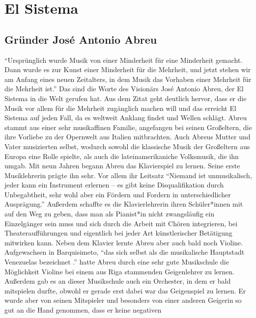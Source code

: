 \section{El Sistema}

\subsection{Gründer José Antonio Abreu}

\enquote{Ursprünglich wurde Musik von einer Minderheit für eine Minderheit
gemacht. Dann wurde es zur Kunst einer Minderheit für die Mehrheit, und jetzt
stehen wir am Anfang eines neuen Zeitalters, in dem Musik das Vorhaben einer
Mehrheit für die Mehrheit ist.} \autocite[5]{kaufmann:el_sistema} Das sind die
Worte des Visionärs José Antonio Abreu, der El Sistema in die Welt gerufen hat. Aus dem Zitat geht
deutlich hervor, dass er die Musik vor allem für die Mehrheit zugänglich machen
will und das erreicht El Sistema auf jeden Fall, da es weltweit Anklang findet
und Wellen schlägt. Abreu stammt aus einer sehr musikaffinen Familie, angefangen
bei seinen Großeltern, die ihre Vorliebe zu der Opernwelt aus Italien
mitbrachten. Auch Abreus Mutter und Vater musizierten selbst, wodurch sowohl die
klassische Musik der Großeltern aus Europa eine Rolle spielte, als auch die
lateinamerikaniche Volksmusik, die ihn umgab. Mit neun Jahren begann Abreu das
Klavierspiel zu lernen. Seine erste Musiklehrerin prägte ihn sehr. Vor allem ihr
Leitsatz \enquote{Niemand ist unmusikalisch, jeder kann ein Instrument erlernen
– es gibt keine Disqualifikation durch Unbegabtheit, sehr wohl aber ein Fördern
und Fordern in unterschiedlicher Ausprägung.} \autocite[20]{kaufmann:el_sistema}
Außerdem schaffte es die Klavierlehrerin ihren Schüler*innen mit auf den Weg zu
geben, dass man als Pianist*in nicht zwangsläufig ein Einzelgänger sein muss und
sich durch die Arbeit mit Chören integrieren, bei Theateraufführungen und
eigentlich bei jeder Art künstlerischer Betätigung mitwirken kann. Neben dem
Klavier lernte Abreu aber auch bald noch Violine. Aufgewachsen in Barquisimeto,
\enquote{das sich selbst als die musikalische Hauptstadt Venezuelas
bezeichnet \textelp{}.} \autocite[22]{kaufmann:el_sistema} hatte Abreu durch eine sehr
gute Musikschule die Möglichkeit Violine bei einem aus Riga stammenden
Geigenlehrer zu lernen. Außerdem gab es an dieser Musikschule auch ein
Orchester, in dem er bald mitspielen durfte, obwohl er gerade erst dabei war das
Geigenspiel zu lernen. Er wurde aber von seinen Mitspieler und besonders von
einer anderen Geigerin so gut an die Hand genommen, dass er keine negativen
